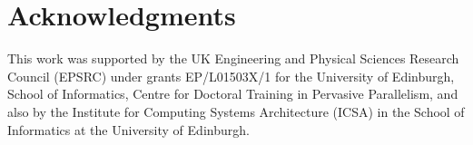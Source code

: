 \documentclass[sigplan,10pt]{acmart}
\theoremstyle{definition}
\begin{document}
\section*{Acknowledgments}

This work was supported by the UK Engineering
and Physical Sciences Research Council (EPSRC) under grants
EP/L01503X/1 for the University of Edinburgh, School
of Informatics, Centre for Doctoral Training in Pervasive
Parallelism, %
and also by the Institute for Computing Systems Architecture (ICSA)
in the School of Informatics at the University of Edinburgh.



\end{document}
